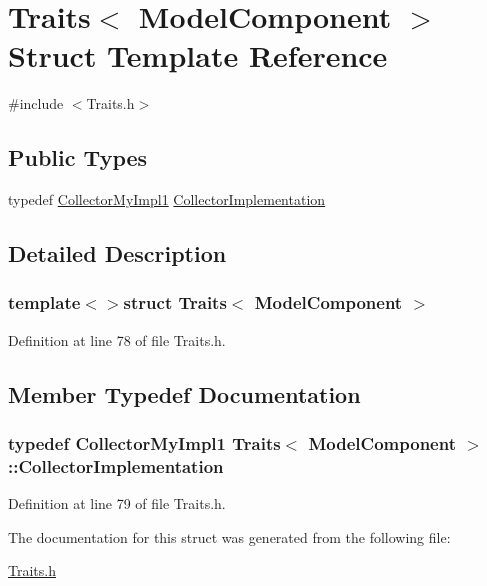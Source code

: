 \hypertarget{struct_traits_3_01_model_component_01_4}{\section{Traits$<$ Model\-Component $>$ Struct Template Reference}
\label{struct_traits_3_01_model_component_01_4}
}


{\ttfamily \#include $<$Traits.\-h$>$}

\subsection*{Public Types}
\begin{DoxyCompactItemize}
\item 
typedef \hyperlink{class_collector_my_impl1}{Collector\-My\-Impl1} \hyperlink{struct_traits_3_01_model_component_01_4_aea662c7138c7186aa5d60a6912d0010a}{Collector\-Implementation}
\end{DoxyCompactItemize}


\subsection{Detailed Description}
\subsubsection*{template$<$$>$struct Traits$<$ Model\-Component $>$}



Definition at line 78 of file Traits.\-h.



\subsection{Member Typedef Documentation}
\hypertarget{struct_traits_3_01_model_component_01_4_aea662c7138c7186aa5d60a6912d0010a}{
\subsubsection[{Collector\-Implementation}]{\setlength{\rightskip}{0pt plus 5cm}typedef {\bf Collector\-My\-Impl1} {\bf Traits}$<$ {\bf Model\-Component} $>$\-::{\bf Collector\-Implementation}}}\label{struct_traits_3_01_model_component_01_4_aea662c7138c7186aa5d60a6912d0010a}


Definition at line 79 of file Traits.\-h.



The documentation for this struct was generated from the following file\-:\begin{DoxyCompactItemize}
\item 
\hyperlink{_traits_8h}{Traits.\-h}\end{DoxyCompactItemize}
